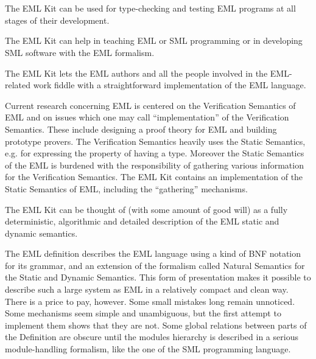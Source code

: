 \section{\secover}
\label{sec:over}

\subsection{\secsml}
\label{sec:sml}

{


The EML Kit can be used for type-checking and testing EML programs
at all stages of their development. 

The EML Kit can help in teaching EML or SML programming
or in developing SML software with the EML formalism. 

The EML Kit lets the EML authors and all the people involved in
the EML-related work fiddle with a straightforward implementation of the EML language.

Current research concerning EML is centered on the Verification
Semantics of EML and on issues which one may call ``implementation''
of the Verification Semantics. These include designing a proof theory
for EML and building prototype provers. 
The Verification Semantics heavily uses the Static Semantics, 
e.g. for expressing the property of having a type.
Moreover the Static Semantics of the EML is burdened with
the responsibility of gathering various information for the Verification Semantics.
The EML Kit contains an implementation of the Static Semantics of EML,
including the ``gathering'' mechanisms.

The EML Kit can be thought of (with some amount of good will)
as a fully deterministic, algorithmic and detailed
description of the EML static and dynamic semantics.

The EML definition describes the EML language using
a kind of BNF notation for its grammar, and an extension
of the formalism called Natural Semantics for the Static and Dynamic Semantics.
This form of presentation makes it possible to
describe such a large system as EML in a relatively compact
and clean way. There is a price to pay, however.
Some small mistakes long remain unnoticed.
Some mechanisms seem simple and unambiguous, 
but the first attempt to implement them
shows that they are not.
Some global relations between parts of the Definition 
are obscure until the modules hierarchy
is described in a serious module-handling formalism, like the 
one of the SML programming language.

}
